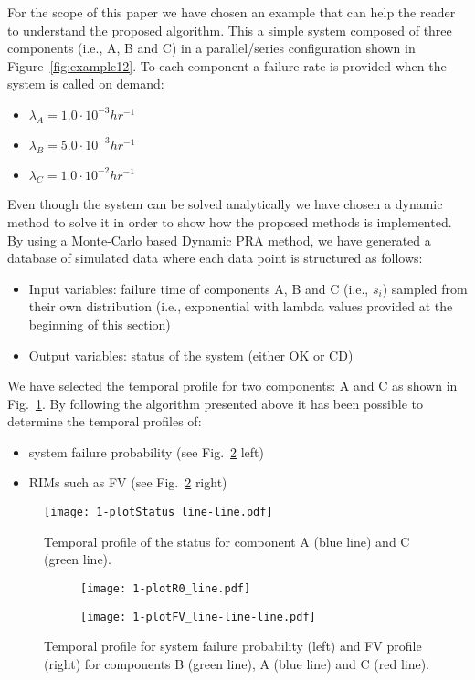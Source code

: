 For the scope of this paper we have chosen an example that can help the reader to 
understand the proposed algorithm. This a simple system composed of three components 
(i.e., A, B and C) in a parallel/series configuration shown in Figure~\ref{fig:example12}. 
To each component a failure rate is 
provided when the system is called on demand:
\begin{itemize}
  \item $\lambda_A=1.0 \cdot 10^{-3} hr^{-1}$
  \item $\lambda_B=5.0 \cdot 10^{-3} hr^{-1}$
  \item $\lambda_C=1.0 \cdot 10^{-2} hr^{-1}$
\end{itemize}
  
Even though the system can be solved analytically we have chosen a dynamic method to solve it in 
order to show how the proposed methods is implemented. 
By using a Monte-Carlo based Dynamic PRA method, we have generated a database of simulated data 
where each data point is structured as follows:
\begin{itemize}
  \item Input variables: failure time of components A, B and C (i.e., $s_i$) sampled from their 
        own distribution (i.e., exponential with lambda values provided at the beginning of this section)
  \item Output variables: status of the system (either OK or CD)
\end{itemize}

We have selected the temporal profile for two components: A and C as shown in Fig.~\ref{fig:plotStatus_line-line}. 
By following the algorithm presented above it has been possible to determine the temporal profiles of:
\begin{itemize}
  \item system failure probability (see Fig.~\ref{fig:timeDepPlots} left)
  \item RIMs such as FV (see Fig.~\ref{fig:timeDepPlots} right) 
\end{itemize}

\begin{figure}
    \centering
    \centerline{\texttt{[image: 1-plotStatus\_line-line.pdf]}}
    \caption{Temporal profile of the status for component A (blue line) and C (green line).}
    \label{fig:plotStatus_line-line}
\end{figure}

\begin{figure}
  \centering
  \begin{subfigure}{.5\textwidth}
    \centering
    \centerline{\texttt{[image: 1-plotR0\_line.pdf]}}
  \end{subfigure}%
  \begin{subfigure}{.5\textwidth}
    \centering
    \centerline{\texttt{[image: 1-plotFV\_line-line-line.pdf]}}
  \end{subfigure}
  \caption{Temporal profile for system failure probability (left) and FV profile (right) for 
           components B (green line), A (blue line) and C (red line).}
  \label{fig:timeDepPlots}
\end{figure}


